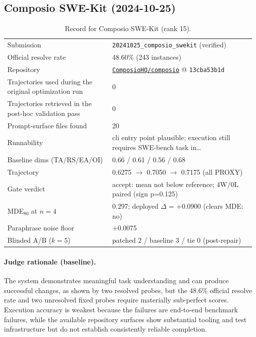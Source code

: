 \subsection{Composio SWE-Kit (2024-10-25)}
\label{app:agent15}
\begin{table}[H]\centering\scriptsize
\caption{Record for Composio SWE-Kit (rank 15).}
\begin{tabular}{lp{8.2cm}}\toprule
Submission & \texttt{20241025\_\allowbreak{}composio\_\allowbreak{}swekit} (verified) \\
Official resolve rate & 48.60\% (243 instances) \\
Repository & \href{https://github.com/ComposioHQ/composio}{\texttt{ComposioHQ/composio}} @ \texttt{13cba53b1d} \\
Trajectories used during the original optimization run & 0 \\
Trajectories retrieved in the post-hoc validation pass & 0 \\
Prompt-surface files found & 20 \\
Runnability & cli entry point plausible; execution still requires SWE-bench task in\ldots{} \\
Baseline dims (TA/RS/EA/OI) & 0.66 / 0.61 / 0.56 / 0.68 \\
Trajectory & 0.6275 $\to$ 0.7050 $\to$ 0.7175 (all PROXY) \\
Gate verdict & accept: mean not below reference; 4W/0L paired (sign p=0.125) \\
MDE$_{80}$ at $n{=}4$ & 0.297; deployed $\Delta$ = +0.0900 (clears MDE: no) \\
Paraphrase noise floor & +0.0075 \\
Blinded A/B ($k{=}5$) & patched 2 / baseline 3 / tie 0 (post-repair) \\
\bottomrule\end{tabular}\end{table}
\paragraph{Judge rationale (baseline).}
The system demonstrates meaningful task understanding and can produce successful changes, as shown by two resolved probes, but the 48.6\% official resolve rate and two unresolved fixed probes require materially sub-perfect scores. Execution accuracy is weakest because the failures are end-to-end benchmark failures, while the available repository surfaces show substantial tooling and test infrastructure but do not establish consistently reliable completion.
